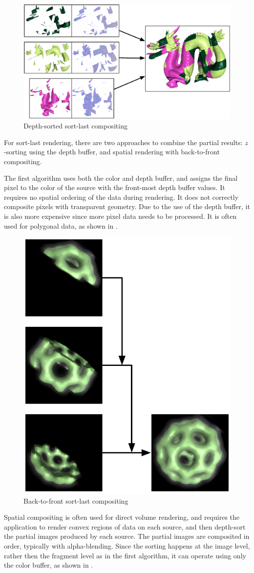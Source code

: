 \begin{figure}
 \includegraphics[width=.618\textwidth]{images/depth}
 {\caption{\label{fDepth}Depth-sorted sort-last compositing}}
\end{figure}

For sort-last rendering, there are two approaches to combine the partial
results: $z$-sorting using the depth buffer, and spatial rendering with
back-to-front compositing.

The first algorithm uses both the color and depth buffer, and assigns the final
pixel to the color of the source with the front-most depth buffer values. It
requires no spatial ordering of the data during rendering. It does not
correctly composite pixels with transparent geometry. Due to the use of the
depth buffer, it is also more expensive since more pixel data needs to be
processed. It is often used for polygonal data, as shown in .

\begin{figure}
 \includegraphics[width=.312\textwidth]{images/sorted}
 {\caption{\label{fSorted}Back-to-front sort-last compositing}}
\end{figure}

Spatial compositing is often used for direct volume rendering, and requires the
application to render convex regions of data on each source, and then depth-sort
the partial images produced by each source. The partial images are composited in
order, typically with alpha-blending. Since the sorting happens at the image
level, rather then the fragment level as in the first algorithm, it can operate
using only the color buffer, as shown in .


